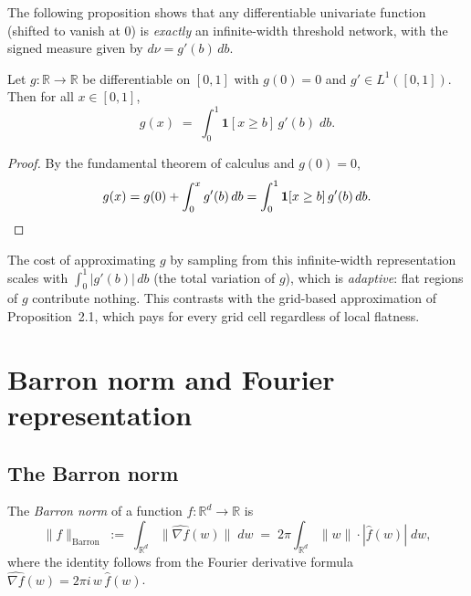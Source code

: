 The following proposition shows that any differentiable univariate function (shifted to
vanish at 0) is \emph{exactly} an infinite-width threshold network, with the signed
measure given by $d\nu = g'(b)\, db$.

\begin{proposition}\label{prop:univariateIntegralRep}
Let $g : \mathbb{R} \to \mathbb{R}$ be differentiable on $[0,1]$ with $g(0) = 0$ and
$g' \in L^1([0,1])$.  Then for all $x \in [0,1]$,
\[
  g(x) \;=\; \int_0^1 \mathbf{1}[x \ge b]\, g'(b)\; db.
\]
\end{proposition}

\begin{proof}
By the fundamental theorem of calculus and $g(0) = 0$,
\[
  g(x) = g(0) + \int_0^x g'(b)\, db = \int_0^1 \mathbf{1}[x \ge b]\, g'(b)\, db. \qedhere
\]
\end{proof}

\begin{remark}
  The cost of approximating $g$ by sampling from this infinite-width representation
  scales with $\int_0^1 |g'(b)|\, db$ (the total variation of $g$), which is
  \emph{adaptive}: flat regions of $g$ contribute nothing.
  This contrasts with the grid-based approximation of Proposition~2.1, which pays for
  every grid cell regardless of local flatness.
\end{remark}

\section{Barron norm and Fourier representation}
\label{sec:barron-norm}

\subsection{The Barron norm}

\begin{definition}\label{def:barronNorm}
The \emph{Barron norm} of a function $f : \mathbb{R}^d \to \mathbb{R}$ is
\[
  \|f\|_{\mathrm{Barron}}
  \;:=\; \int_{\mathbb{R}^d} \bigl\|\widehat{\nabla f}(w)\bigr\|\; dw
  \;=\; 2\pi \int_{\mathbb{R}^d} \|w\| \cdot |\widehat{f}(w)|\; dw,
\]
where the identity follows from the Fourier derivative formula
$\widehat{\nabla f}(w) = 2\pi i\, w\, \widehat{f}(w)$.
\end{definition}

